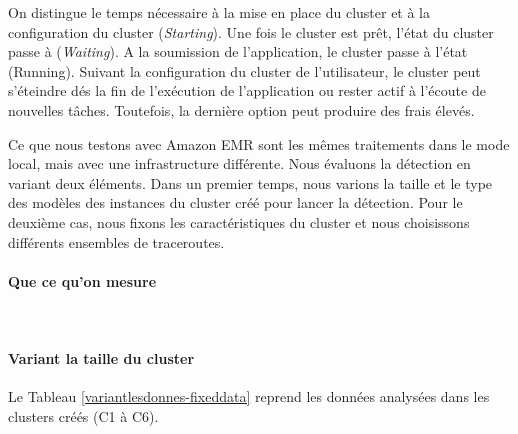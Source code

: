 On distingue le temps nécessaire à la mise en place du cluster et à la configuration du cluster (\textit{Starting}). Une fois le cluster est prêt, l'état du cluster passe à (\textit{Waiting}).  A la soumission de l'application, le cluster passe à l'état (Running). Suivant la configuration du cluster de l'utilisateur, le cluster peut s'éteindre dés la fin de l'exécution de l'application ou rester actif à l'écoute de nouvelles tâches. Toutefois, la dernière option peut produire des frais élevés.  


Ce que nous testons avec Amazon EMR sont les mêmes traitements dans le mode local, mais avec une infrastructure différente. Nous évaluons la détection en variant deux éléments. Dans un premier temps, nous varions la taille et le type des modèles des instances du cluster créé pour lancer la détection. Pour le deuxième cas, nous fixons les caractéristiques du cluster et  nous choisissons différents ensembles de traceroutes. 


\paragraph{Que ce qu'on mesure}~



\begin{figure}[H]
	\centering
	\captionsetup{justification=centering}
	\resizebox{\textwidth}{!}{
		
	}
	\caption{ }
	\label{fig:sparktimingEMR}
\end{figure}


\paragraph{Variant la taille du cluster}

Le Tableau 	\ref{variantlesdonnes-fixeddata} reprend les données analysées dans les clusters créés (C1 à C6).

\begin{table}[H]
	\centering
	\caption{Les données analysées dans les clusters C1 à C6 }
	\label{variantlesdonnes-fixeddata}
\end{table}

